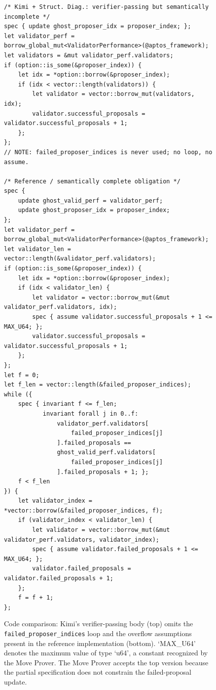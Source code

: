 \begin{figure}[t]
\centering
\begin{lstlisting}[language=Move,basicstyle=\scriptsize\ttfamily]
/* Kimi + Struct. Diag.: verifier-passing but semantically incomplete */
spec { update ghost_proposer_idx = proposer_index; };
let validator_perf = borrow_global_mut<ValidatorPerformance>(@aptos_framework);
let validators = &mut validator_perf.validators;
if (option::is_some(&proposer_index)) {
    let idx = *option::borrow(&proposer_index);
    if (idx < vector::length(validators)) {
        let validator = vector::borrow_mut(validators, idx);
        validator.successful_proposals = validator.successful_proposals + 1;
    };
};
// NOTE: failed_proposer_indices is never used; no loop, no assume.

/* Reference / semantically complete obligation */
spec {
    update ghost_valid_perf = validator_perf;
    update ghost_proposer_idx = proposer_index;
};
let validator_perf = borrow_global_mut<ValidatorPerformance>(@aptos_framework);
let validator_len = vector::length(&validator_perf.validators);
if (option::is_some(&proposer_index)) {
    let idx = *option::borrow(&proposer_index);
    if (idx < validator_len) {
        let validator = vector::borrow_mut(&mut validator_perf.validators, idx);
        spec { assume validator.successful_proposals + 1 <= MAX_U64; };
        validator.successful_proposals = validator.successful_proposals + 1;
    };
};
let f = 0;
let f_len = vector::length(&failed_proposer_indices);
while ({
    spec { invariant f <= f_len;
           invariant forall j in 0..f:
               validator_perf.validators[
                   failed_proposer_indices[j]
               ].failed_proposals ==
               ghost_valid_perf.validators[
                   failed_proposer_indices[j]
               ].failed_proposals + 1; };
    f < f_len
}) {
    let validator_index = *vector::borrow(&failed_proposer_indices, f);
    if (validator_index < validator_len) {
        let validator = vector::borrow_mut(&mut validator_perf.validators, validator_index);
        spec { assume validator.failed_proposals + 1 <= MAX_U64; };
        validator.failed_proposals = validator.failed_proposals + 1;
    };
    f = f + 1;
};
\end{lstlisting}
\caption{Code comparison: Kimi's verifier-passing body (top) omits the \texttt{failed\_proposer\_indices} loop and the overflow assumptions present in the reference implementation (bottom).
`MAX\_U64' denotes the maximum value of type `u64', a constant recognized by the Move Prover.
The Move Prover accepts the top version because the partial specification does not constrain the failed-proposal update.}
\label{fig:false-verified-code}
\end{figure}

